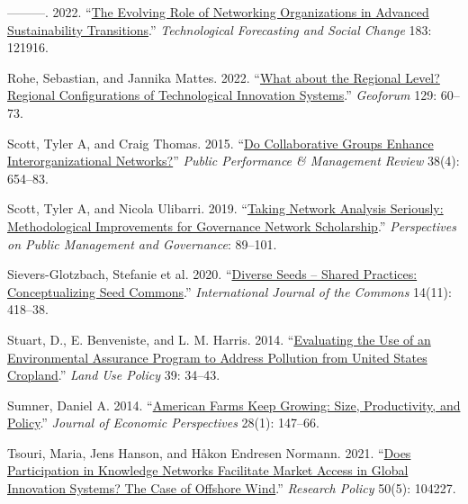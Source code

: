 \documentclass[twoside,12pt,final]{ucthesis-CA2012}
\newlength{\cslhangindent}
\newenvironment{CSLReferences}[2] %
 {%
  \setlength{\parindent}{0pt}
  \ifodd #1 \everypar{\setlength{\hangindent}{\cslhangindent}}\ignorespaces\fi
  \ifnum #2 > 0
  \setlength{\parskip}{#2\baselineskip}
  \fi
 }%
 {}
\begin{document}
\begin{ucmainmatter}
\begin{CSLReferences}{1}{0}
\leavevmode{}%
---------. 2022. {``\href{https://doi.org/10.1016/j.techfore.2022.121916}{The Evolving Role of Networking Organizations in Advanced Sustainability Transitions}.''} \emph{Technological Forecasting and Social Change} 183: 121916.

\leavevmode{}%
Rohe, Sebastian, and Jannika Mattes. 2022. {``\href{https://doi.org/10.1016/j.geoforum.2022.01.007}{What about the Regional Level? Regional Configurations of Technological Innovation Systems}.''} \emph{Geoforum} 129: 60--73.

\leavevmode{}%
Scott, Tyler A, and Craig Thomas. 2015. {``\href{https://doi.org/10.1080/15309576.2015.1031008}{Do Collaborative Groups Enhance Interorganizational Networks?}''} \emph{Public Performance \& Management Review} 38(4): 654--83.

\leavevmode{}%
Scott, Tyler A, and Nicola Ulibarri. 2019. {``\href{https://doi.org/10.1093/ppmgov/gvy011}{Taking Network Analysis Seriously: Methodological Improvements for Governance Network Scholarship}.''} \emph{Perspectives on Public Management and Governance}: 89--101.

\leavevmode{}%
Sievers-Glotzbach, Stefanie et al. 2020. {``\href{https://doi.org/10.5334/ijc.1043}{Diverse Seeds -- Shared Practices: Conceptualizing Seed Commons}.''} \emph{International Journal of the Commons} 14(11): 418--38.

\leavevmode{}%
Stuart, D., E. Benveniste, and L. M. Harris. 2014. {``\href{https://doi.org/10.1016/j.landusepol.2014.03.009}{Evaluating the Use of an Environmental Assurance Program to Address Pollution from United States Cropland}.''} \emph{Land Use Policy} 39: 34--43.

\leavevmode{}%
Sumner, Daniel A. 2014. {``\href{https://doi.org/10.1257/jep.28.1.147}{American Farms Keep Growing: Size, Productivity, and Policy}.''} \emph{Journal of Economic Perspectives} 28(1): 147--66.

\leavevmode{}%
Tsouri, Maria, Jens Hanson, and Håkon Endresen Normann. 2021. {``\href{https://doi.org/10.1016/j.respol.2021.104227}{Does Participation in Knowledge Networks Facilitate Market Access in Global Innovation Systems? The Case of Offshore Wind}.''} \emph{Research Policy} 50(5): 104227.


\end{CSLReferences}
\end{ucmainmatter}
\end{document}
